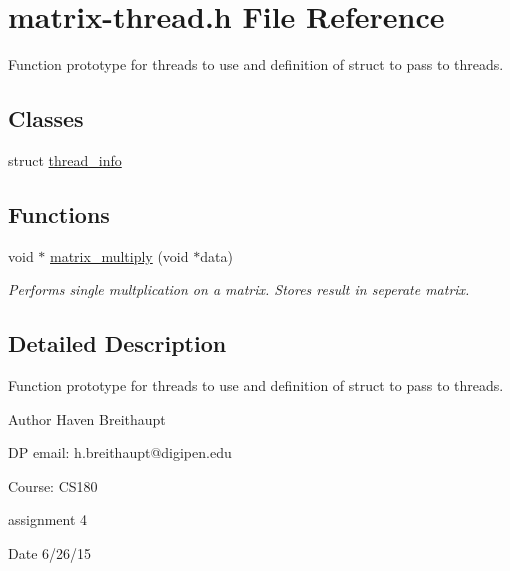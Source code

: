\hypertarget{matrix-thread_8h}{\section{matrix-\/thread.h File Reference}
\label{matrix-thread_8h}
}


Function prototype for threads to use and definition of struct to pass to threads.  


\subsection*{Classes}
\begin{DoxyCompactItemize}
\item 
struct \hyperlink{structthread__info}{thread\-\_\-info}
\end{DoxyCompactItemize}
\subsection*{Functions}
\begin{DoxyCompactItemize}
\item 
void $\ast$ \hyperlink{matrix-thread_8h_a85752b7afcbffcee8b67735793f8960a}{matrix\-\_\-multiply} (void $\ast$data)
\begin{DoxyCompactList}\small\item\em Performs single multplication on a matrix. Stores result in seperate matrix. \end{DoxyCompactList}\end{DoxyCompactItemize}


\subsection{Detailed Description}
Function prototype for threads to use and definition of struct to pass to threads. \begin{DoxyAuthor}{Author}
Haven Breithaupt 
\end{DoxyAuthor}
\begin{DoxyParagraph}{D\-P email\-: h.breithaupt@digipen.edu}

\end{DoxyParagraph}
\begin{DoxyParagraph}{Course\-: C\-S180}

\end{DoxyParagraph}
\begin{DoxyParagraph}{assignment 4}

\end{DoxyParagraph}
\begin{DoxyDate}{Date}
6/26/15 
\end{DoxyDate}


